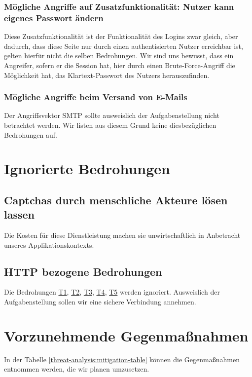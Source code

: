 \documentclass[12pt,DIV14,BCOR10mm,a4paper,parskip=half-,headsepline,headinclude,english,ngerman,bibliography=totocnumbered]{scrreprt}
\begin{document}
\subsubsection{Mögliche Angriffe auf Zusatzfunktionalität: Nutzer kann eigenes Passwort ändern}

Diese Zusatzfunktionalität ist der Funktionalität des Logins zwar gleich, aber dadurch, dass diese Seite nur durch einen authentisierten Nutzer erreichbar ist, gelten hierfür nicht die selben Bedrohungen.
Wir sind uns bewusst, dass ein Angreifer, sofern er die Session hat, hier durch einen Brute-Force-Angriff die Möglichkeit hat, das Klartext-Passwort des Nutzers herauszufinden.

\subsubsection{Mögliche Angriffe beim Versand von E-Mails}
Der Angriffsvektor SMTP sollte ausweislich der Aufgabenstellung nicht betrachtet werden. Wir listen aus diesem Grund keine diesbezüglichen Bedrohungen auf.

\newcommand{\linktothreat}[2]{\texorpdfstring{\protect\hyperlink{#1}{#2}}{}}%

\section{Ignorierte Bedrohungen}
\subsection{Captchas durch menschliche Akteure lösen lassen}
Die Kosten für diese Dienstleistung machen sie unwirtschaftlich in Anbetracht unseres Applikationskontexts.

\subsection{HTTP bezogene Bedrohungen}
Die Bedrohungen \linktothreat{threat1}{T1}, \linktothreat{threat2}{T2}, \linktothreat{threat3}{T3}, \linktothreat{threat4}{T4}, \linktothreat{threat5}{T5} werden ignoriert.
Ausweislich der Aufgabenstellung sollen wir eine sichere Verbindung annehmen.

\section{Vorzunehmende Gegenmaßnahmen}

In der Tabelle \ref{threat-analysis:mitigation-table} können die Gegenmaßnahmen entnommen werden, die wir planen umzusetzen.
\end{document}
